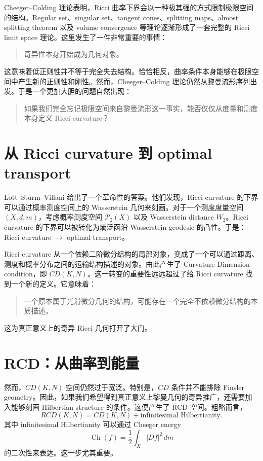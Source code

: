 \documentclass[lualatex]{article}
\begin{document}
Cheeger--Colding 理论表明，Ricci 曲率下界会以一种极其强的方式限制极限空间的结构。Regular set、singular set、tangent cones、splitting maps、almost splitting theorem 以及 volume convergence 等理论逐渐形成了一套完整的 Ricci limit space 理论。这里发生了一件非常重要的事情：

\begin{quote}
奇异性本身开始成为几何对象。
\end{quote}

这意味着低正则性并不等于完全失去结构。恰恰相反，曲率条件本身能够在极限空间中产生新的正则性和刚性。然而，Cheeger--Colding 理论仍然从黎曼流形序列出发。于是一个更加大胆的问题自然出现：

\begin{quote}
如果我们完全忘记极限空间来自黎曼流形这一事实，能否仅仅从度量和测度本身定义 Ricci curvature？
\end{quote}

\section{从 Ricci curvature 到 optimal transport}

Lott--Sturm--Villani 给出了一个革命性的答案。他们发现，Ricci curvature 的下界可以通过概率测度空间上的 Wasserstein 几何来刻画。对于一个测度度量空间 $(X,d,m)$，考虑概率测度空间 $\mathcal{P}_2(X)$ 以及 Wasserstein distance $W_2$。Ricci curvature 的下界可以被转化为熵泛函沿 Wasserstein geodesic 的凸性。于是：Ricci curvature $\longrightarrow$ optimal transport。

Ricci curvature 从一个依赖二阶微分结构的局部对象，变成了一个可以通过距离、测度和概率分布之间的运输结构描述的对象。由此产生了 Curvature-Dimension condition，即 $CD(K,N)$。这一转变的重要性远远超过了给 Ricci curvature 找到一个新的定义。它意味着：

\begin{quote}
一个原本属于光滑微分几何的结构，可能存在一个完全不依赖微分结构的本质描述。
\end{quote}

这为真正意义上的奇异 Ricci 几何打开了大门。

\section{RCD：从曲率到能量}

然而，$CD(K,N)$ 空间仍然过于宽泛。特别是，$CD$ 条件并不能排除 Finsler geometry。因此，如果我们希望得到真正意义上黎曼几何的奇异推广，还需要加入能够刻画 Hilbertian structure 的条件。这便产生了 RCD 空间。粗略而言，
\[
    RCD(K,N) = CD(K,N) + \text{infinitesimal Hilbertianity}.
\]
其中 infinitesimal Hilbertianity 可以通过 Cheeger energy
\[
    \operatorname{Ch}(f) = \frac{1}{2} \int_X |Df|^2 \, dm
\]
的二次性来表达。这一步尤其重要。
\end{document}
